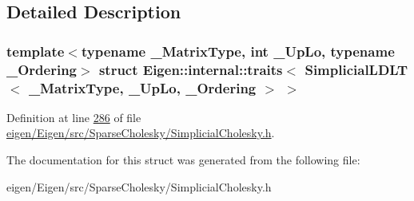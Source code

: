 \subsection{Detailed Description}
\subsubsection*{template$<$typename \+\_\+\+Matrix\+Type, int \+\_\+\+Up\+Lo, typename \+\_\+\+Ordering$>$\newline
struct Eigen\+::internal\+::traits$<$ Simplicial\+L\+D\+L\+T$<$ \+\_\+\+Matrix\+Type, \+\_\+\+Up\+Lo, \+\_\+\+Ordering $>$ $>$}



Definition at line \hyperlink{eigen_2_eigen_2src_2_sparse_cholesky_2_simplicial_cholesky_8h_source_l00286}{286} of file \hyperlink{eigen_2_eigen_2src_2_sparse_cholesky_2_simplicial_cholesky_8h_source}{eigen/\+Eigen/src/\+Sparse\+Cholesky/\+Simplicial\+Cholesky.\+h}.



The documentation for this struct was generated from the following file\+:\begin{DoxyCompactItemize}
\item 
eigen/\+Eigen/src/\+Sparse\+Cholesky/\+Simplicial\+Cholesky.\+h\end{DoxyCompactItemize}
